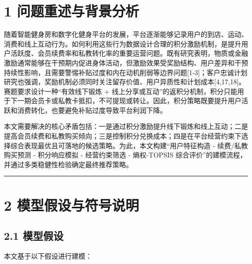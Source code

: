 \documentclass[
  12pt,
]{ctexart}
\begin{document}
\hypertarget{ux95eeux9898ux91cdux8ff0ux4e0eux80ccux666fux5206ux6790}{%
\section{1 问题重述与背景分析}\label{ux95eeux9898ux91cdux8ff0ux4e0eux80ccux666fux5206ux6790}}

随着智能健身房和数字化健身平台的发展，平台逐渐能够记录用户的到店、运动、消费和线上互动行为。如何利用这些行为数据设计合理的积分激励机制，是提升用户活跃度、会员续费率和私教转化率的重要运营问题。既有研究表明，物质或金融激励通常能够在干预期内促进身体活动，但激励效果受奖励结构、用户差异和干预持续性影响，且需要警惕补贴过度和内在动机削弱等边界问题{[}1-3{]}；客户忠诚计划研究也强调，奖励机制必须同时关注留存价值、用户异质性和计划成本{[}4,17,18{]}。赛题要求设计一种``有效线下锻炼 + 线上分享或互动''的返积分机制，积分只能用于下一期会员卡或私教卡抵扣，不可提现或转让。因此，积分策略既要提升用户活跃和消费转化，也要避免补贴过度导致平台利润下降。

本文需要解决的核心矛盾包括：一是通过积分激励提升线下锻炼和线上互动；二是提高会员续费和私教购买倾向；三是控制积分兑换成本；四是在平台经营约束下选择综合表现最优且可落地的候选策略。为此，本文构建``用户特征构造 - 续费/私教购买预测 - 积分响应模拟 - 经营约束筛选 - 熵权-TOPSIS 综合评价''的建模流程，并通过多类稳健性检验确定最终推荐策略。

\begin{center}\rule{0.5\linewidth}{0.5pt}\end{center}

\hypertarget{ux6a21ux578bux5047ux8bbeux4e0eux7b26ux53f7ux8bf4ux660e}{%
\section{2 模型假设与符号说明}\label{ux6a21ux578bux5047ux8bbeux4e0eux7b26ux53f7ux8bf4ux660e}}

\hypertarget{ux6a21ux578bux5047ux8bbe}{%
\subsection{2.1 模型假设}\label{ux6a21ux578bux5047ux8bbe}}

本文基于以下假设进行建模：
\end{document}
